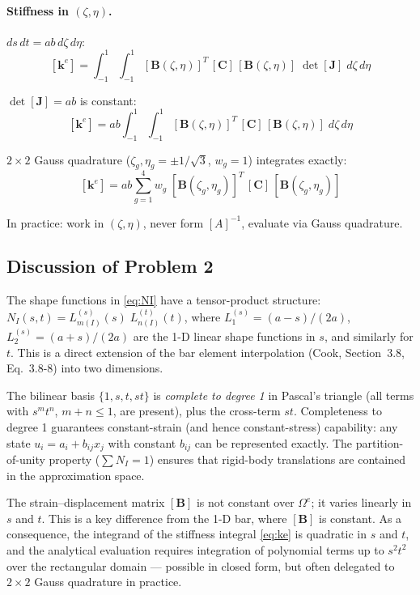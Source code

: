 \documentclass[11pt, a4paper]{article}
\begin{document}
\paragraph{Stiffness in $(\zeta,\eta)$.}
$ds\,dt=ab\,d\zeta\,d\eta$:
\begin{equation}\label{eq:ke_nat}
[\mathbf{k}^e]=\int_{-1}^{1}\!\int_{-1}^{1}[\mathbf{B}(\zeta,\eta)]^T\,[\mathbf{C}]\,[\mathbf{B}(\zeta,\eta)]\;\det[\mathbf{J}]\;d\zeta\,d\eta
\end{equation}

$\det[\mathbf{J}]=ab$ is constant:
\begin{equation}\label{eq:ke_nat2}
[\mathbf{k}^e]=ab\int_{-1}^{1}\!\int_{-1}^{1}[\mathbf{B}(\zeta,\eta)]^T\,[\mathbf{C}]\,[\mathbf{B}(\zeta,\eta)]\;d\zeta\,d\eta
\end{equation}

$2\times 2$ Gauss quadrature ($\zeta_g,\eta_g=\pm 1/\sqrt{3}$, $w_g=1$) integrates exactly:
\begin{equation}\label{eq:ke_gauss}
[\mathbf{k}^e]=ab\sum_{g=1}^{4}w_g\;[\mathbf{B}(\zeta_g,\eta_g)]^T\,[\mathbf{C}]\,[\mathbf{B}(\zeta_g,\eta_g)]
\end{equation}

In practice: work in $(\zeta,\eta)$, never form $[A]^{-1}$, evaluate via Gauss quadrature.

\subsection{Discussion of Problem 2}

The shape functions in \cref{eq:NI} have a tensor-product structure: $N_I(s,t)=L^{(s)}_{m(I)}(s)\;L^{(t)}_{n(I)}(t)$, where $L^{(s)}_1=(a-s)/(2a)$, $L^{(s)}_2=(a+s)/(2a)$ are the 1-D linear shape functions in $s$, and similarly for $t$.  This is a direct extension of the bar element interpolation (Cook, Section~3.8, Eq.~3.8-8) into two dimensions.

The bilinear basis $\{1,s,t,st\}$ is \textit{complete to degree 1} in Pascal's triangle (all terms with $s^m t^n$, $m+n\le 1$, are present), plus the cross-term $st$.  Completeness to degree 1 guarantees constant-strain (and hence constant-stress) capability: any state $u_i=a_i+b_{ij}x_j$ with constant $b_{ij}$ can be represented exactly.  The partition-of-unity property ($\sum N_I=1$) ensures that rigid-body translations are contained in the approximation space.

The strain--displacement matrix $[\mathbf{B}]$ is not constant over $\Omega^e$; it varies linearly in $s$ and $t$.  This is a key difference from the 1-D bar, where $[\mathbf{B}]$ is constant.  As a consequence, the integrand of the stiffness integral \cref{eq:ke} is quadratic in $s$ and $t$, and the analytical evaluation requires integration of polynomial terms up to $s^2t^2$ over the rectangular domain --- possible in closed form, but often delegated to $2\times 2$ Gauss quadrature in practice.
\end{document}
